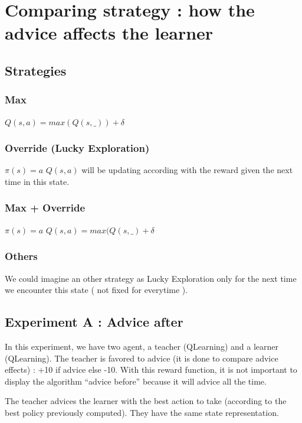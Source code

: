 \documentclass[a4paper,12pt]{article}
\begin{document}
      \section{Comparing strategy : how the advice affects the learner}
      \subsection{Strategies}
      \subsubsection{Max}
       $Q(s,a) = max(Q(s,\_)) + \delta$
       \subsubsection{Override (Lucky Exploration)}
       $\pi(s)=a$ \newline
       $Q(s,a)$ will be updating according with the reward given the next time in this state.
       \subsubsection{Max + Override}
	$\pi(s)=a$ \newline
	$Q(s,a) = max(Q(s,\_) + \delta$

	\subsubsection{Others}
      We could imagine an other strategy as Lucky Exploration only for 
      the next time we encounter this state ( not fixed for everytime ).
      
      \subsection{Experiment A : Advice after}
      In this experiment, we have two agent, a teacher (QLearning) and a learner (QLearning).
      The teacher is favored to advice (it is done to compare advice effects) : +10 if advice
      else -10. With this reward function, it is not important to display the algorithm ``advice before''
      because it will advice all the time.
      
      The teacher advices the learner with the best action to take (according to 
      the best policy previously computed). They have the same state representation.
            
\end{document}

